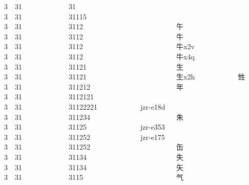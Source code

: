  
3 {\cjk{}} 31            {\cjk{}} 31                            {\cjk{}} 
3 {\cjk{}} 31            {\cjk{}} 31115                         {\cjk{}} 
3 {\cjk{}} 31            {\cjk{}} 3112                          {\cjk{}午} 
3 {\cjk{}} 31            {\cjk{}} 3112                          {\cjk{}牛} 
3 {\cjk{}} 31            {\cjk{}} 3112                          {\cjk{}牛}x2v            {} 
3 {\cjk{}} 31            {\cjk{}} 3112                          {\cjk{}牛}x4q            {} 
3 {\cjk{}} 31            {\cjk{}} 31121                         {\cjk{}生} 
3 {\cjk{}} 31            {\cjk{}} 31121                         {\cjk{}生}x2h            {\cjk{}甡} 
3 {\cjk{}} 31            {\cjk{}} 311212                        {\cjk{}年} 
3 {\cjk{}} 31            {\cjk{}} 3112121                       {} 
3 {\cjk{}} 31            {\cjk{}} 31122221            jzr-e18d  {} 
3 {\cjk{}} 31            {\cjk{}} 311234                        {\cjk{}朱} 
3 {\cjk{}} 31            {\cjk{}} 31125               jzr-e353  {} 
3 {\cjk{}} 31            {\cjk{}} 311252              jzr-e175  {} 
3 {\cjk{}} 31            {\cjk{}} 311252                        {\cjk{}缶} 
3 {\cjk{}} 31            {\cjk{}} 31134                         {\cjk{}失} 
3 {\cjk{}} 31            {\cjk{}} 31134                         {\cjk{}矢} 
3 {\cjk{}} 31            {\cjk{}} 3115                          {\cjk{}气} 
